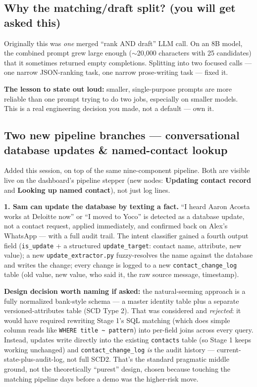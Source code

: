 \documentclass[11pt, a4paper]{article}
\begin{document}
\subsection{Why the matching/draft split? (you will get asked this)}
\label{sec:split}

Originally this was \emph{one} merged ``rank AND draft'' LLM call. On an 8B model, the combined prompt grew large enough ($\sim$20{,}000 characters with 25 candidates) that it sometimes returned empty completions. Splitting into two focused calls --- one narrow JSON-ranking task, one narrow prose-writing task --- fixed it.

\textbf{The lesson to state out loud:} smaller, single-purpose prompts are more reliable than one prompt trying to do two jobs, especially on smaller models. This is a real engineering decision you made, not a default --- own it.

\subsection{Two new pipeline branches --- conversational database updates \& named-contact lookup}
\label{sec:newbranches}

Added this session, on top of the same nine-component pipeline. Both are visible live on the dashboard's pipeline stepper (new nodes: \textbf{Updating contact record} and \textbf{Looking up named contact}), not just log lines.

\textbf{1. Sam can update the database by texting a fact.} ``I heard Aaron Acosta works at Deloitte now'' or ``I moved to Yoco'' is detected as a database update, not a contact request, applied immediately, and confirmed back on Alex's WhatsApp --- with a full audit trail. The intent classifier gained a fourth output field (\texttt{is\_update} + a structured \texttt{update\_target}: contact name, attribute, new value); a new \texttt{update\_extractor.py} fuzzy-resolves the name against the database and writes the change; every change is logged to a new \texttt{contact\_change\_log} table (old value, new value, who said it, the raw source message, timestamp).

\textbf{Design decision worth naming if asked:} the natural-seeming approach is a fully normalized bank-style schema --- a master identity table plus a separate versioned-attributes table (SCD Type 2). That was considered and \emph{rejected}: it would have required rewriting Stage 1's SQL matching (which does simple column reads like \texttt{WHERE title \textasciitilde{} pattern}) into per-field joins across every query. Instead, updates write directly into the existing \texttt{contacts} table (so Stage 1 keeps working unchanged) and \texttt{contact\_change\_log} \emph{is} the audit history --- current-state-plus-audit-log, not full SCD2. That's the standard pragmatic middle ground, not the theoretically ``purest'' design, chosen because touching the matching pipeline days before a demo was the higher-risk move.
\end{document}
